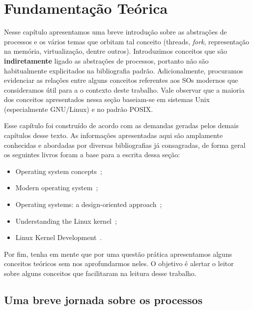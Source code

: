 \chapter{Fundamentação Teórica}
\label{cap:fundamentacao}

Nesse capítulo apresentamos uma breve introdução sobre as abstrações de
processos e os vários temas que orbitam tal conceito (threads, \emph{fork},
representação na memória, virtualização, dentre outros). Introduzimos conceitos
que são \textbf{indiretamente} ligado as abstrações de processos, portanto não
são habitualmente explicitados na bibliografia padrão. Adicionalmente,
procuramos evidenciar as relações entre alguns conceitos referentes aos SOs
modernos que consideramos útil para a o contexto deste trabalho. Vale observar
que a maioria dos conceitos apresentados nessa seção baseiam-se em sistemas
Unix (especialmente GNU/Linux) e no padrão POSIX.

Esse capítulo foi construído de acordo com as demandas geradas pelos demais
capítulos desse texto. As informações apresentadas aqui são amplamente
conhecidas e abordadas por diversas bibliografias já consagradas, de forma
geral os seguintes livros foram a base para a escrita dessa seção:

\begin{itemize}
  \item Operating system concepts~\citep{silberschatz};
  \item Modern operating system~\citep{tanenbaum};
  \item Operating systems: a design-oriented approach~\citep{crowley};
  \item Understanding the Linux kernel~\citep{entendendo_kernel};
  \item Linux Kernel Development~\citep{love}.
\end{itemize}

Por fim, tenha em mente que por uma questão prática apresentamos alguns
conceitos teóricos sem nos aprofundarmos neles. O objetivo é alertar o leitor
sobre alguns conceitos que facilitaram na leitura desse trabalho.

\label{cap:fundamentacao-teorica}

\section{Uma breve jornada sobre os processos}
\label{sec:processos-e-threads}

